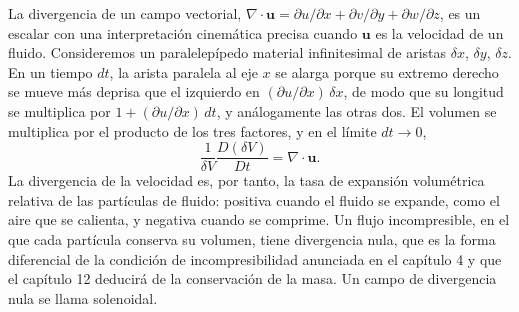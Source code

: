 \documentclass[10pt,openany]{book}
\begin{document}
\begin{minipage}{\linewidth}
%
\fi
\fi
\endgroup
\par\nopagebreak
{}
\end{minipage}
\par\vspace{\baselineskip}

La divergencia de un campo vectorial, \(\nabla\cdot\mathbf{u} = \partial u/\partial x + \partial v/\partial y + \partial w/\partial z\), es un escalar con una interpretación cinemática precisa cuando \(\mathbf{u}\) es la velocidad de un fluido. Consideremos un paralelepípedo material infinitesimal de aristas \(\delta x\), \(\delta y\), \(\delta z\). En un tiempo \(dt\), la arista paralela al eje \(x\) se alarga porque su extremo derecho se mueve más deprisa que el izquierdo en \((\partial u/\partial x)\,\delta x\), de modo que su longitud se multiplica por \(1 + (\partial u/\partial x)\,dt\), y análogamente las otras dos. El volumen se multiplica por el producto de los tres factores, y en el límite \(dt \to 0\),
\begin{equation}
\frac{1}{\delta V}\frac{D(\delta V)}{Dt} = \nabla\cdot\mathbf{u}. \label{eq:c11-dilatacion}
\end{equation}
La divergencia de la velocidad es, por tanto, la tasa de expansión volumétrica relativa de las partículas de fluido: positiva cuando el fluido se expande, como el aire que se calienta, y negativa cuando se comprime. Un flujo incompresible, en el que cada partícula conserva su volumen, tiene divergencia nula, que es la forma diferencial de la condición de incompresibilidad anunciada en el capítulo 4 y que el capítulo 12 deducirá de la conservación de la masa. Un campo de divergencia nula se llama solenoidal.
\end{document}

